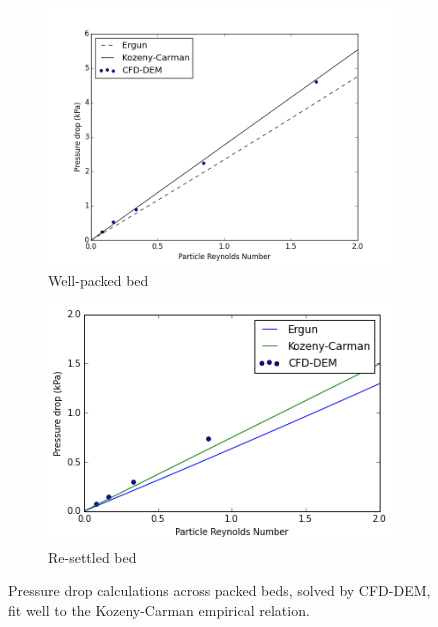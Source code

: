 \begin{figure}
        \centering
        \begin{subfigure}[b]{0.75\textwidth}
                \includegraphics[width=\textwidth]{chapters/figures/pressureDrops-full.png}
                \caption{Well-packed bed}
                \label{fig:pressure-drop-full}
        \end{subfigure}%
        
        \begin{subfigure}[b]{0.75\textwidth}
                \includegraphics[width=\textwidth]{chapters/figures/pressureDrops-evap.png}
                \caption{Re-settled bed}
                \label{fig:pressure-drop-evap}
        \end{subfigure}
        \caption{Pressure drop calculations across packed beds, solved by CFD-DEM, fit well to the Kozeny-Carman empirical relation.}\label{fig:cfdem-pressure-drop}
\end{figure}



